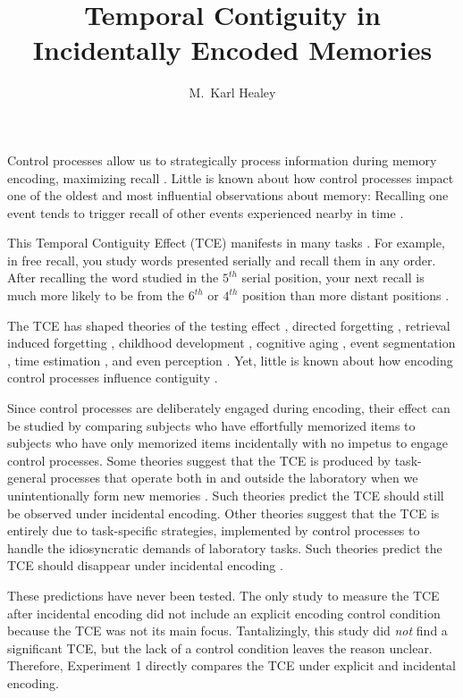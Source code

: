 \documentclass[man,natbib,floatsintext]{apa6} %
\title{Temporal Contiguity in Incidentally Encoded Memories}
\author{M.\ Karl Healey}
\affiliation{Michigan State University}
\begin{document}
\maketitle

Control processes \citep{LehmMalm13,RaaiShif81} allow us to strategically process information during memory encoding, maximizing recall \citep[e.g.,][]{Unsw16}. Little is known about how control processes impact one of the oldest and most influential observations about memory: Recalling one event tends to trigger recall of other events experienced nearby in time \citep{Aris,Bowe72,Kaha96}.

This Temporal Contiguity Effect (TCE) manifests in many tasks \citep{DaviEtal08,SchwEtal05}. For example, in free recall, you study words presented serially and recall them in any order. After recalling the word studied in the $5^{th}$ serial position, your next recall is much more likely to be from the $6^{th}$ or $4^{th}$ position than more distant positions \citep{Kaha96}.

The TCE has shaped theories of  the testing effect \citep{KarpEtal14}, directed forgetting \citep{SahaEtal13}, retrieval induced forgetting \citep{KlieBaum16}, childhood development \citep{JarroEtal15}, cognitive aging \citep{WahlHuff15,HealKaha15}, event segmentation \citep{EzzyDava14}, time estimation \citep{SahaSmit13}, and even perception \citep{TurkEtal12}. Yet, little is known about how encoding control processes influence contiguity \citep{Hint16}.

Since control processes are deliberately engaged during encoding, their effect can be studied by comparing subjects who have effortfully memorized items to subjects who have only memorized items incidentally with no impetus to engage control processes. Some theories suggest that the TCE is produced by task-general processes that operate both in and outside the laboratory when we unintentionally form new memories \citep{HealEtal14,LohnEtal14}. Such theories predict the TCE should still be observed under incidental encoding. Other theories suggest that the TCE is entirely due to task-specific strategies, implemented by control processes to handle the idiosyncratic demands of laboratory tasks. Such theories predict the TCE should disappear under incidental encoding \citep{Hint16}.

These predictions have never been tested. The only study to measure the TCE after incidental encoding \citep{NairEtal17} did not include an explicit encoding control condition because the TCE was not its main focus. Tantalizingly, this study did \emph{not} find a significant TCE, but the lack of a control condition leaves the reason unclear. Therefore, Experiment 1 directly compares the TCE under explicit and incidental encoding.
\end{document}

